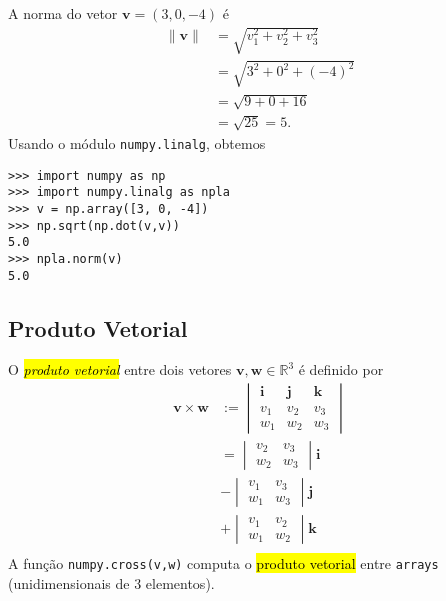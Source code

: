 \begin{ex}
  A norma do vetor $\pmb{v} = (3, 0, -4)$ é
  \begin{subequations}
    \begin{align}
      \|\pmb{v}\| &= \sqrt{v_1^2 + v_2^2 + v_3^2}\\
                  &= \sqrt{3^2 + 0^2 + (-4)^2}\\
                  &= \sqrt{9 + 0 + 16}\\
                  &= \sqrt{25} = 5.
    \end{align}
  \end{subequations}
  Usando o módulo \lstinline+numpy.linalg+, obtemos

\begin{lstlisting}
>>> import numpy as np
>>> import numpy.linalg as npla
>>> v = np.array([3, 0, -4])
>>> np.sqrt(np.dot(v,v))
5.0
>>> npla.norm(v)
5.0
\end{lstlisting}

\end{ex}

\subsection{Produto Vetorial}

O \hl{\emph{produto vetorial}} entre dois vetores $\pmb{v}, \pmb{w}\in\mathbb{R}^3$ é definido por
\begin{subequations}
  \begin{align}
    \pmb{v}\times\pmb{w} &:=
                           \begin{vmatrix}
                             \pmb{i} & \pmb{j} & \pmb{k}\\
                             v_1 & v_2 & v_3\\
                             w_1 & w_2 & w_3
                           \end{vmatrix}\\
                         &=
                           \begin{vmatrix}
                             v_2 & v_3\\
                             w_2 & w_3
                           \end{vmatrix}\pmb{i}\\
                         &- \begin{vmatrix}
                             v_1 & v_3\\
                             w_1 & w_3
                           \end{vmatrix}\pmb{j}\\
                         &+ \begin{vmatrix}
                             v_1 & v_2\\
                             w_1 & w_2
                           \end{vmatrix}\pmb{k}\\
  \end{align}
\end{subequations}
A função \lstinline+numpy.cross(v,w)+ computa o \hl{produto vetorial} entre \lstinline+arrays+ (unidimensionais de 3 elementos).

